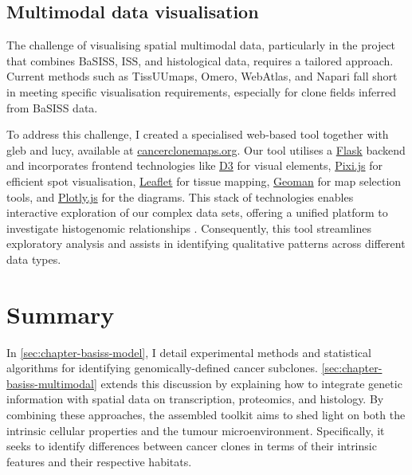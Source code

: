 
\subsection{Multimodal data visualisation}
\label{sec:modalities-cancerclonemaps}

The challenge of visualising spatial multimodal data, particularly in the project that combines \ac{BaSISS}, \ac{ISS}, and histological data, requires a tailored approach. Current methods such as \ac{TissUUmaps}, \ac{Omero}, \ac{WebAtlas}, and \ac{Napari} fall short in meeting specific visualisation requirements, especially for clone fields inferred from \ac{BaSISS} data.

To address this challenge, I created a specialised web-based tool together with \acl{gleb} and \acl{lucy}, available at \href{https://www.cancerclonemaps.org/}{cancerclonemaps.org}. Our tool utilises a \href{https://github.com/pallets/flask}{Flask} backend and incorporates frontend technologies like \href{https://github.com/d3/d3}{D3} for visual elements, \href{https://github.com/pixijs/pixijs}{Pixi.js} for efficient spot visualisation, \href{https://github.com/Leaflet/Leaflet}{Leaflet} for tissue mapping, \href{https://github.com/geoman-io/leaflet-geoman}{Geoman} for map selection tools, and \href{https://github.com/plotly/plotly.js}{Plotly.js} for the diagrams. This stack of technologies enables interactive exploration of our complex data sets, offering a unified platform to investigate histogenomic relationships . Consequently, this tool streamlines exploratory analysis and assists in identifying qualitative patterns across different data types.

\section{Summary}
\label{sec:modalities-summary}

In \cref{sec:chapter-basiss-model}, I detail experimental methods and statistical algorithms for identifying genomically-defined cancer subclones. \cref{sec:chapter-basiss-multimodal} extends this discussion by explaining how to integrate genetic information with spatial data on transcription, proteomics, and histology. By combining these approaches, the assembled toolkit aims to shed light on both the intrinsic cellular properties and the tumour microenvironment. Specifically, it seeks to identify differences between cancer clones in terms of their intrinsic features and their respective habitats.

